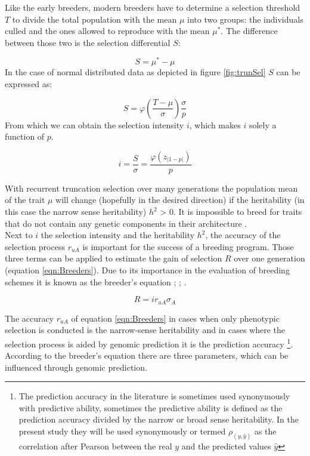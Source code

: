 Like the early breeders, modern breeders have to determine a selection threshold $T$ to divide the
total population with the mean $\mu$ into two groups: the individuals culled and the ones allowed to
reproduce with the mean $\mu^{\ast}$. The difference between those two is the selection differential
$S$:

\begin{equation}
 S = \mu^{\ast} - \mu
\label{eqn:S}
\end{equation}
\noindent
In the case of normal distributed data as depicted in figure \ref{fig:trunSel} $S$ can be expressed as:

\begin{equation}
S = \varphi (\frac{T - \mu}{\sigma}) \frac{\sigma}{p}
\end{equation}
\noindent
From which we can obtain the selection intensity $i$, which makes $i$ solely a function of $p$.

\begin{equation}
i = \frac{S}{\sigma} = \frac{\varphi (z_{|1-p|})}{p}
\end{equation}

With recurrent truncation selection over many generations the population mean of the trait
$\mu$ will change (hopefully in the desired direction) if the heritability (in this case
the narrow sense heritability) $h^2$ > 0. It is impossible to breed for traits that do not
contain any genetic components in their architecture \cite{walsh2018}.\\
Next to $i$ the selection intensity and the heritability $h^2$, the accuracy of the selection process
$r_{uA}$ is important for the success of a breeding program. Those three terms can be
applied to estimate the gain of selection $R$ over one generation (equation
\ref{eqn:Breeders}). Due to its importance in the evaluation of breeding schemes it is
known as the breeder's equation \cite{mousseau1987natural}; \cite{falconer1996};
\cite{kingsolver2001strength}.

\begin{equation}
 R = i r_{uA} \sigma_A
\label{eqn:Breeders}
\end{equation}

The accuracy $r_{uA}$ of equation \ref{eqn:Breeders} in cases when only phenotypic
selection is conducted is the narrow-sense heritability and in cases where the selection
process is aided by genomic prediction it is the prediction accuracy \footnote{The
  prediction accuracy in the literature is sometimes used synonymously with predictive
  ability, sometimes the predictive ability is defined as the prediction accuracy divided
  by the narrow or broad sense heritability. In the present study they will be used
  synonymously or termed $\rho_{(y,\hat{y})}$ as the correlation after Pearson between the
  real $y$ and the predicted values $\hat{y}$}. According to the breeder's equation there
are three parameters, which can be influenced through genomic
prediction. \\

